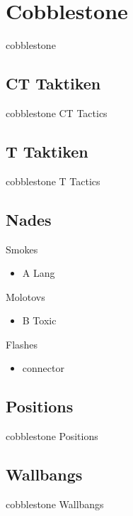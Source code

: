 \newpage




\chapter{Cobblestone}
\label{chap:cobblestone}
cobblestone

\section{CT Taktiken}
\label{sect:cobblestone_ct}
cobblestone CT Tactics

\section{T Taktiken}
\label{sect:cobblestone_t}
cobblestone T Tactics

\section{Nades}
\label{sect:cobblestone_nades}
Smokes
\begin{itemize}
\item A Lang
\end{itemize}

Molotovs
\begin{itemize}
\item B Toxic
\end{itemize}

Flashes
\begin{itemize}
\item connector
\end{itemize}

\section{Positions}
\label{sect:cobblestone_positions}
cobblestone Positions

\section{Wallbangs}
\label{sect:cobblestone_wallbangs}
cobblestone Wallbangs
